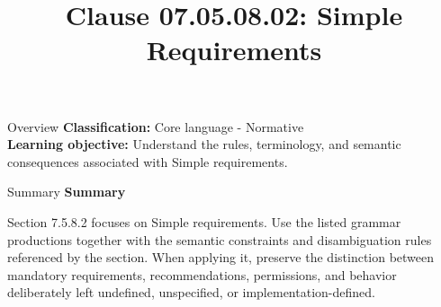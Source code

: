 \documentclass[10pt,letterpaper]{article}
\title{Clause 07.05.08.02: Simple Requirements}
\author{}
\date{}
\begin{document}
\maketitle
\begin{CornellOverviewBox}{Overview}
\textbf{Classification:} Core language - Normative\\[2pt]
\textbf{Learning objective:} Understand the rules, terminology, and semantic consequences associated with Simple requirements.
\end{CornellOverviewBox}\begin{CornellSummaryBox}{Summary}
{\sffamily\bfseries\color{Accent} Summary}\par\vspace{3pt}Section 7.5.8.2 focuses on Simple requirements. Use the listed grammar productions together with the semantic constraints and disambiguation rules referenced by the section. When applying it, preserve the distinction between mandatory requirements, recommendations, permissions, and behavior deliberately left undefined, unspecified, or implementation-defined.
\end{CornellSummaryBox}
\end{document}
